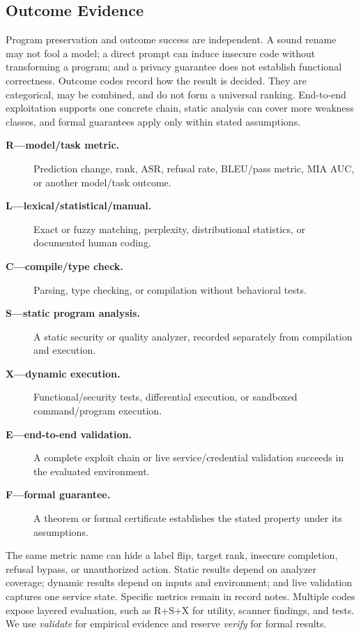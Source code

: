 \documentclass[acmsmall,screen,review]{acmart}
\begin{document}
\subsection{Outcome Evidence}
Program preservation and outcome success are independent. A sound rename may not fool a model; a direct prompt can induce insecure code without transforming a program; and a privacy guarantee does not establish functional correctness. Outcome codes record how the result is decided. They are categorical, may be combined, and do not form a universal ranking. End-to-end exploitation supports one concrete chain, static analysis can cover more weakness classes, and formal guarantees apply only within stated assumptions.
\begin{description}
\item[\textbf{R---model/task metric.}] Prediction change, rank, ASR, refusal rate, BLEU/pass metric, MIA AUC, or another model/task outcome.
\item[\textbf{L---lexical/statistical/manual.}] Exact or fuzzy matching, perplexity, distributional statistics, or documented human coding.
\item[\textbf{C---compile/type check.}] Parsing, type checking, or compilation without behavioral tests.
\item[\textbf{S---static program analysis.}] A static security or quality analyzer, recorded separately from compilation and execution.
\item[\textbf{X---dynamic execution.}] Functional/security tests, differential execution, or sandboxed command/program execution.
\item[\textbf{E---end-to-end validation.}] A complete exploit chain or live service/credential validation succeeds in the evaluated environment.
\item[\textbf{F---formal guarantee.}] A theorem or formal certificate establishes the stated property under its assumptions.
\end{description}

The same metric name can hide a label flip, target rank, insecure completion, refusal bypass, or unauthorized action. Static results depend on analyzer coverage; dynamic results depend on inputs and environment; and live validation captures one service state. Specific metrics remain in record notes. Multiple codes expose layered evaluation, such as \textsf{R+S+X} for utility, scanner findings, and tests. We use \emph{validate} for empirical evidence and reserve \emph{verify} for formal results.
\end{document}
